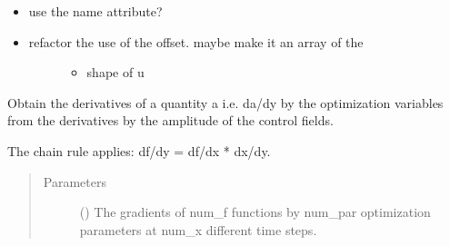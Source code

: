 \documentclass[letterpaper,10pt,english]{sphinxmanual}
\begin{document}
\begin{fulllineitems}
\begin{fulllineitems}
\begin{itemize}
\begin{description}
\begin{itemize}
\end{itemize}

\end{description}

\item {} 
use the name attribute?

\item {} \begin{description}
\item[{refactor the use of the offset. maybe make it an array of the}] \leavevmode\begin{itemize}
\item {} 
shape of u

\end{itemize}

\end{description}

\end{itemize}

\end{fulllineitems}


\begin{fulllineitems}
\label{\detokenize{qsim:qsim.transfer_function.TransferFunction.gradient_chain_rule}}
Obtain the derivatives of a quantity a i.e. da/dy by the optimization
variables from the derivatives by the amplitude of the control fields.

The chain rule applies: df/dy = df/dx * dx/dy.
\begin{quote}\begin{description}
\item[{Parameters}] \leavevmode
{} (\sphinxstyleliteralemphasis{\sphinxupquote{, }}\sphinxstyleliteralemphasis{\sphinxupquote{ (}}\sphinxstyleliteralemphasis{\sphinxupquote{, }}\sphinxstyleliteralemphasis{\sphinxupquote{, }}\sphinxstyleliteralemphasis{\sphinxupquote{)}}) \textendash{} The gradients of num\_f functions by num\_par optimization parameters
at num\_x different time steps.


\end{description}
\end{quote}
\end{fulllineitems}
\end{fulllineitems}
\end{document}

